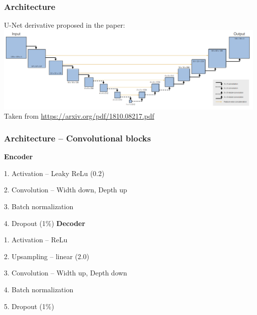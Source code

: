 \begin{frame}
    \frametitle{Architecture}

U-Net derivative proposed in the paper: \\[\baselineskip]

\includegraphics[width=\textwidth, height=.55\textheight]{./Ressourcen/Praesentation/Bilder/architecture.png}%
\newline
Taken from \url{https://arxiv.org/pdf/1810.08217.pdf}
\end{frame}
\clearpage

\begin{frame}
    \frametitle{Architecture -- Convolutional blocks}
\vspace*{0.8cm}
\begin{multicols}{2}
    \textbf{Encoder}

    1. Activation -- Leaky ReLu (0.2)

    2. Convolution -- Width down, Depth up

    3. Batch normalization

    4. Dropout (1\%)
    \vfill\columnbreak
    \textbf{Decoder}
    
    1. Activation -- ReLu
    
    2. Upsampling -- linear (2.0)

    3. Convolution -- Width up, Depth down

    4. Batch normalization

    5. Dropout (1\%)
    
\end{multicols}
    
\end{frame}
\clearpage

